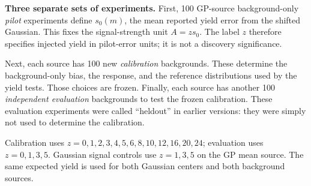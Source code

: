 \documentclass[11pt]{article}
\begin{document}
\textbf{Three separate sets of experiments.} First, 100 GP-source background-only \emph{pilot} experiments define $s_0(m)$, the mean reported yield error from the shifted Gaussian. This fixes the signal-strength unit $A=z s_0$. The label $z$ therefore specifies injected yield in pilot-error units; it is not a discovery significance.

Next, each source has 100 new \emph{calibration} backgrounds. These determine the background-only bias, the response, and the reference distributions used by the yield tests. Those choices are frozen. Finally, each source has another 100 \emph{independent evaluation} backgrounds to test the frozen calibration. These evaluation experiments were called ``heldout'' in earlier versions: they were simply not used to determine the calibration.

Calibration uses $z=0,1,2,3,4,5,6,8,10,12,16,20,24$; evaluation uses $z=0,1,3,5$. Gaussian signal controls use $z=1,3,5$ on the GP mean source. The same expected yield is used for both Gaussian centers and both background sources.
\end{document}
